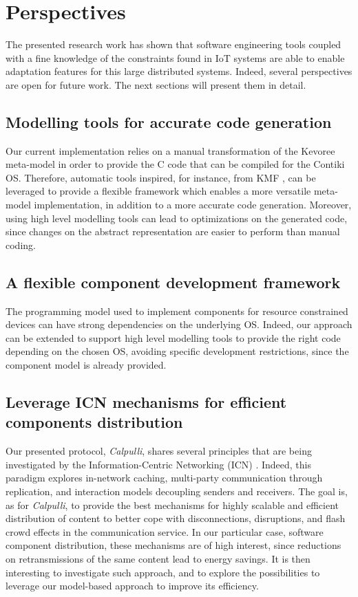 \chapter{Perspectives}
\label{sec:Perspectives}
The presented research work has shown that software engineering tools coupled with a fine knowledge of the constraints found in IoT systems are able to enable adaptation features for this large distributed systems.
Indeed, several perspectives are open for future work.
The next sections will present them in detail.

\section{Modelling tools for accurate code generation}
Our current implementation relies on a manual transformation of the Kevoree meta-model in order to provide the C code that can be compiled for the Contiki OS.
Therefore, automatic tools inspired, for instance, from KMF \cite{fouquet2012eclipse}, can be leveraged to provide a flexible framework which enables a more versatile meta-model implementation, in addition to a more accurate code generation.
Moreover, using high level modelling tools can lead to optimizations on the generated code, since changes on the abstract representation are easier to perform than manual coding.

\section{A flexible component development framework} 
The programming model used to implement components for resource constrained devices can have strong dependencies on the underlying OS.
Indeed, our approach can be extended to support high level modelling tools to provide the right code depending on the chosen OS, avoiding specific development restrictions, since the component model is already provided.

\section{Leverage ICN mechanisms for efficient components distribution}
Our presented protocol, \textit{Calpulli}, shares several principles that are being investigated by the Information-Centric Networking (ICN) \cite{ahlgren2012survey}.
Indeed, this paradigm explores in-network caching, multi-party communication through replication, and interaction models decoupling senders and	receivers.
The goal is, as for \textit{Calpulli}, to provide the best mechanisms for highly scalable and efficient distribution of content to better cope with disconnections, disruptions, and flash crowd effects in the communication service.
In our particular case, software component distribution, these mechanisms are of high interest, since reductions on retransmissions of the same content lead to energy savings.
It is then interesting to investigate such approach, and to explore the possibilities to leverage our model-based approach to improve its efficiency. 


